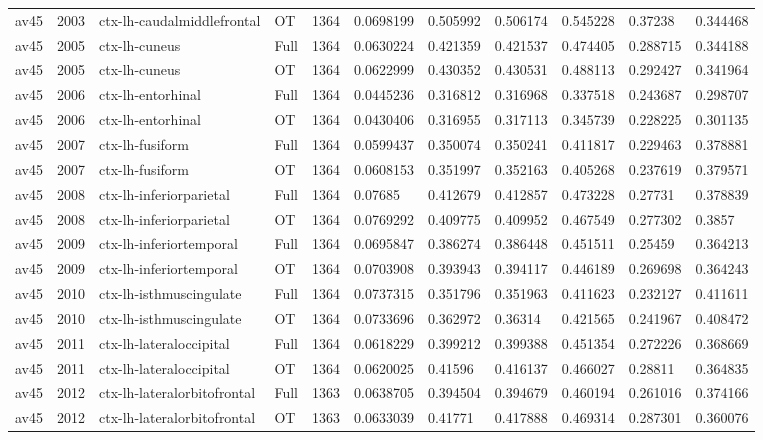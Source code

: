 \begin{landscape}
\begin{longtable}{lllllllllll}
av45 & 2003 & ctx-lh-caudalmiddlefrontal & OT & 1364 & 0.0698199 & 0.505992 & 0.506174 & 0.545228 & 0.37238 & 0.344468 \\
av45 & 2005 & ctx-lh-cuneus & Full & 1364 & 0.0630224 & 0.421359 & 0.421537 & 0.474405 & 0.288715 & 0.344188 \\
av45 & 2005 & ctx-lh-cuneus & OT & 1364 & 0.0622999 & 0.430352 & 0.430531 & 0.488113 & 0.292427 & 0.341964 \\
av45 & 2006 & ctx-lh-entorhinal & Full & 1364 & 0.0445236 & 0.316812 & 0.316968 & 0.337518 & 0.243687 & 0.298707 \\
av45 & 2006 & ctx-lh-entorhinal & OT & 1364 & 0.0430406 & 0.316955 & 0.317113 & 0.345739 & 0.228225 & 0.301135 \\
av45 & 2007 & ctx-lh-fusiform & Full & 1364 & 0.0599437 & 0.350074 & 0.350241 & 0.411817 & 0.229463 & 0.378881 \\
av45 & 2007 & ctx-lh-fusiform & OT & 1364 & 0.0608153 & 0.351997 & 0.352163 & 0.405268 & 0.237619 & 0.379571 \\
av45 & 2008 & ctx-lh-inferiorparietal & Full & 1364 & 0.07685 & 0.412679 & 0.412857 & 0.473228 & 0.27731 & 0.378839 \\
av45 & 2008 & ctx-lh-inferiorparietal & OT & 1364 & 0.0769292 & 0.409775 & 0.409952 & 0.467549 & 0.277302 & 0.3857 \\
av45 & 2009 & ctx-lh-inferiortemporal & Full & 1364 & 0.0695847 & 0.386274 & 0.386448 & 0.451511 & 0.25459 & 0.364213 \\
av45 & 2009 & ctx-lh-inferiortemporal & OT & 1364 & 0.0703908 & 0.393943 & 0.394117 & 0.446189 & 0.269698 & 0.364243 \\
av45 & 2010 & ctx-lh-isthmuscingulate & Full & 1364 & 0.0737315 & 0.351796 & 0.351963 & 0.411623 & 0.232127 & 0.411611 \\
av45 & 2010 & ctx-lh-isthmuscingulate & OT & 1364 & 0.0733696 & 0.362972 & 0.36314 & 0.421565 & 0.241967 & 0.408472 \\
av45 & 2011 & ctx-lh-lateraloccipital & Full & 1364 & 0.0618229 & 0.399212 & 0.399388 & 0.451354 & 0.272226 & 0.368669 \\
av45 & 2011 & ctx-lh-lateraloccipital & OT & 1364 & 0.0620025 & 0.41596 & 0.416137 & 0.466027 & 0.28811 & 0.364835 \\
av45 & 2012 & ctx-lh-lateralorbitofrontal & Full & 1363 & 0.0638705 & 0.394504 & 0.394679 & 0.460194 & 0.261016 & 0.374166 \\
av45 & 2012 & ctx-lh-lateralorbitofrontal & OT & 1363 & 0.0633039 & 0.41771 & 0.417888 & 0.469314 & 0.287301 & 0.360076 \\

\end{longtable}
\end{landscape}

